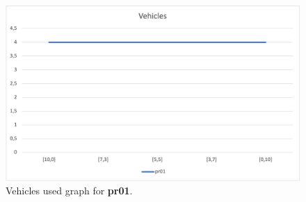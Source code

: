\begin{figure}[H]
    \centering
    \includegraphics[height=0.25\textheight]{../graphs/pr01-vehicles.png}
    \caption{Vehicles used graph for \textbf{pr01}.}
\end{figure}

\newpage
